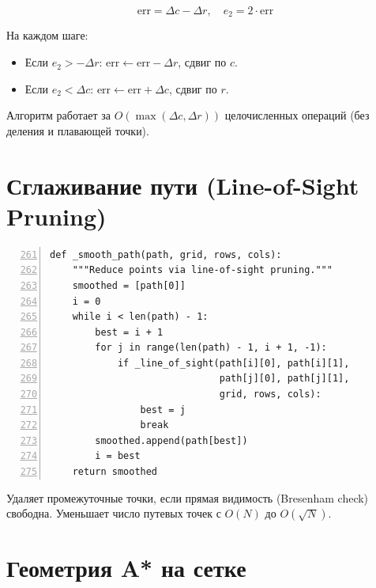 \begin{equation}
  \text{err} = \Delta c - \Delta r, \quad
  e_2 = 2 \cdot \text{err}
  \label{eq:bresenham_err}
\end{equation}

На каждом шаге:
\begin{itemize}
  \item Если $e_2 > -\Delta r$: $\text{err} \leftarrow \text{err} - \Delta r$, сдвиг по $c$.
  \item Если $e_2 < \Delta c$: $\text{err} \leftarrow \text{err} + \Delta c$, сдвиг по $r$.
\end{itemize}

Алгоритм работает за $O(\max(\Delta c, \Delta r))$ целочисленных операций (без деления и плавающей точки).

\section{Сглаживание пути (Line-of-Sight Pruning)}

\begin{filebox}[title={\filepath{simulator.py}, строки 261--279 --- \_smooth\_path()}]
\begin{lstlisting}[style=pythonstyle, numbers=left, firstnumber=261]
def _smooth_path(path, grid, rows, cols):
    """Reduce points via line-of-sight pruning."""
    smoothed = [path[0]]
    i = 0
    while i < len(path) - 1:
        best = i + 1
        for j in range(len(path) - 1, i + 1, -1):
            if _line_of_sight(path[i][0], path[i][1],
                              path[j][0], path[j][1],
                              grid, rows, cols):
                best = j
                break
        smoothed.append(path[best])
        i = best
    return smoothed
\end{lstlisting}
\end{filebox}

Удаляет промежуточные точки, если прямая видимость (Bresenham check) свободна.
Уменьшает число путевых точек с $O(N)$ до $O(\sqrt{N})$.

\section{Геометрия A* на сетке}

